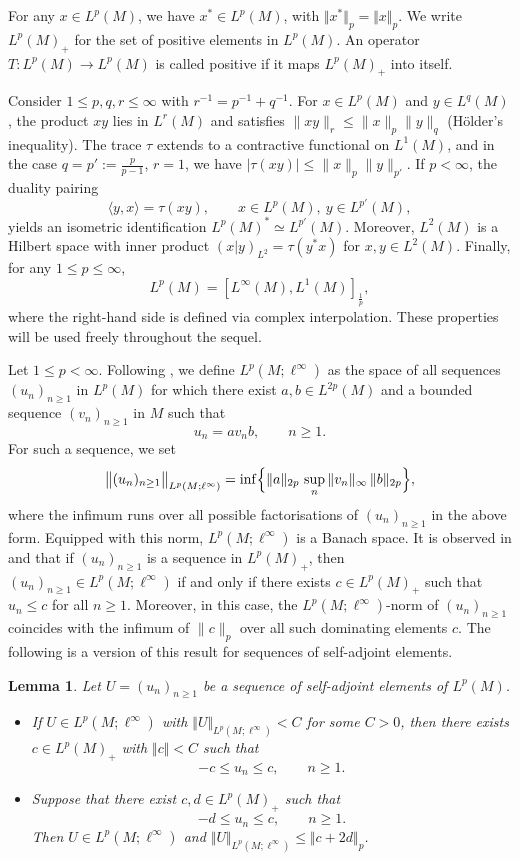 \documentclass[12pt]{amsart}
\newcommand{\norm}[1]{\Vert#1\Vert}
\newtheorem{lemma}[theorem]{Lemma}
\theoremstyle{remark}
\theoremstyle{definition}
\numberwithin{equation}{section}
\begin{document}
For any $x\in L^p(M)$, we have $x^*\in L^p(M)$, with $\norm{x^*}_p=\norm{x}_p$.
We write $L^p(M)_+$ for the set of positive elements in $L^p(M)$. An operator $T \colon L^p(M) \to L^p(M)$ is called positive if it maps $L^p(M)_+$ into itself.

Consider $1 \le p, q, r \le \infty$ with $r^{-1} = p^{-1} + q^{-1}$. For $x \in L^p(M)$ and $y \in L^q(M)$, the product $xy$ lies in $L^r(M)$ and satisfies $\|xy\|_r \le \|x\|_p \|y\|_q$ (Hölder's inequality). The trace $\tau$ extends to a contractive functional on $L^1(M)$, and in the case $q = p' := \frac{p}{p-1}$, $r = 1$, we have $|\tau(xy)| \le \|x\|_p \|y\|_{p'}$. 
If $p<\infty$, the duality pairing
$$
\langle y, x \rangle = \tau(xy), \qquad x \in L^p(M),\ y \in L^{p'}(M),
$$
yields an isometric identification $L^p(M)^* \simeq L^{p'}(M)$. Moreover, $L^2(M)$ is a Hilbert space with inner product 
$(x \vert y)_{L^2} = \tau(y^* x)$ for $x, y \in L^2(M)$.  Finally, for any $1 \le p \le \infty$, 
\begin{equation}\label{2Inter}
L^p(M) = [L^\infty(M), L^1(M)]_{\frac{1}{p}},
\end{equation}
where the right-hand side is defined via complex interpolation. These properties will be used freely throughout the sequel.



Let $1 \le p < \infty$. Following \cite{Ju,JX}, we define $L^p(M;\ell^\infty)$ as the space of all sequences $(u_n)_{n \ge 1}$ in $L^p(M)$ for which there exist $a, b \in L^{2p}(M)$ and a bounded sequence $(v_n)_{n \ge 1}$ in $M$ such that
$$
u_n = a v_n b, \qquad n \ge 1.
$$
For such a sequence, we set
$$
\bigl\|(u_n)_{n \ge 1}\bigr\|_{L^p(M;\ell^\infty)} =
\inf \Bigl\{ \|a\|_{2p} \, \sup_n \|v_n\|_\infty \, \|b\|_{2p} \Bigr\},
$$
where the infimum runs over all possible factorisations of $(u_n)_{n \ge 1}$ in the above form. Equipped with this norm, $L^p(M;\ell^\infty)$ is a Banach space. It is observed in \cite[Remark 3.7]{Ju} and \cite[Section 2]{JX} that if $(u_n)_{n \ge 1}$ is a sequence in $L^p(M)_+$, then $(u_n)_{n \ge 1} \in L^p(M;\ell^\infty)$ if and only if there exists $c \in L^p(M)_+$ such that $u_n \le c$ for all $n \ge 1$. Moreover, in this case, the $L^p(M;\ell^\infty)$-norm of $(u_n)_{n \ge 1}$ coincides with the infimum of $\|c\|_p$ over all such dominating elements $c$. The following is a version of this result for sequences of self-adjoint elements.


\begin{lemma}\label{2sa}
Let $U=(u_n)_{n\geq 1}$ be a sequence of self-adjoint 
elements of $L^p(M)$.
\begin{itemize}
\item [(i)] If $U \in L^p(M;\ell^\infty)$ with $\norm{U}_{L^p(M;\ell^\infty)} < C$ for some $C>0$, then there exists $c \in L^p(M)_+$ with $\norm{c} < C$ such that 
$$
-c \leq u_n \leq c,\qquad n \geq 1.
$$
\item [(ii)] Suppose that there exist $c,d\in L^p(M)_+$ such that 
$$
-d\leq u_n\leq c,\qquad n\geq 1.
$$
Then $U\in L^p(M;\ell^\infty)$ and $\norm{U}_{L^p(M;\ell^\infty)}\leq \norm{c+2d}_p$.
\end{itemize}
\end{lemma}
\end{document}
